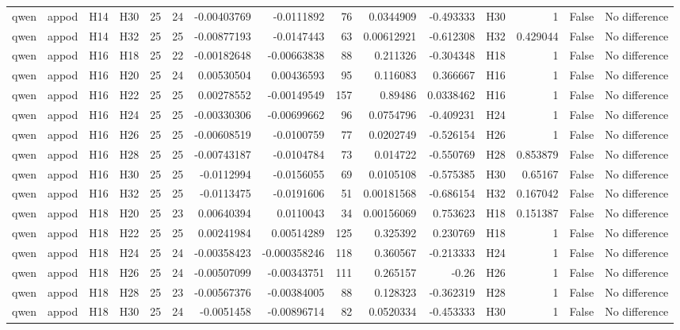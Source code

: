 \begin{longtable}{llllrrrrrrrlrrl}
qwen & appod & H14 & H30 & 25 & 24 & -0.00403769 & -0.0111892 & 76 & 0.0344909 & -0.493333 & H30 & 1 & False & No difference \\
qwen & appod & H14 & H32 & 25 & 25 & -0.00877193 & -0.0147443 & 63 & 0.00612921 & -0.612308 & H32 & 0.429044 & False & No difference \\
qwen & appod & H16 & H18 & 25 & 22 & -0.00182648 & -0.00663838 & 88 & 0.211326 & -0.304348 & H18 & 1 & False & No difference \\
qwen & appod & H16 & H20 & 25 & 24 & 0.00530504 & 0.00436593 & 95 & 0.116083 & 0.366667 & H16 & 1 & False & No difference \\
qwen & appod & H16 & H22 & 25 & 25 & 0.00278552 & -0.00149549 & 157 & 0.89486 & 0.0338462 & H16 & 1 & False & No difference \\
qwen & appod & H16 & H24 & 25 & 25 & -0.00330306 & -0.00699662 & 96 & 0.0754796 & -0.409231 & H24 & 1 & False & No difference \\
qwen & appod & H16 & H26 & 25 & 25 & -0.00608519 & -0.0100759 & 77 & 0.0202749 & -0.526154 & H26 & 1 & False & No difference \\
qwen & appod & H16 & H28 & 25 & 25 & -0.00743187 & -0.0104784 & 73 & 0.014722 & -0.550769 & H28 & 0.853879 & False & No difference \\
qwen & appod & H16 & H30 & 25 & 25 & -0.0112994 & -0.0156055 & 69 & 0.0105108 & -0.575385 & H30 & 0.65167 & False & No difference \\
qwen & appod & H16 & H32 & 25 & 25 & -0.0113475 & -0.0191606 & 51 & 0.00181568 & -0.686154 & H32 & 0.167042 & False & No difference \\
qwen & appod & H18 & H20 & 25 & 23 & 0.00640394 & 0.0110043 & 34 & 0.00156069 & 0.753623 & H18 & 0.151387 & False & No difference \\
qwen & appod & H18 & H22 & 25 & 25 & 0.00241984 & 0.00514289 & 125 & 0.325392 & 0.230769 & H18 & 1 & False & No difference \\
qwen & appod & H18 & H24 & 25 & 24 & -0.00358423 & -0.000358246 & 118 & 0.360567 & -0.213333 & H24 & 1 & False & No difference \\
qwen & appod & H18 & H26 & 25 & 24 & -0.00507099 & -0.00343751 & 111 & 0.265157 & -0.26 & H26 & 1 & False & No difference \\
qwen & appod & H18 & H28 & 25 & 23 & -0.00567376 & -0.00384005 & 88 & 0.128323 & -0.362319 & H28 & 1 & False & No difference \\
qwen & appod & H18 & H30 & 25 & 24 & -0.0051458 & -0.00896714 & 82 & 0.0520334 & -0.453333 & H30 & 1 & False & No difference \\

\end{longtable}
